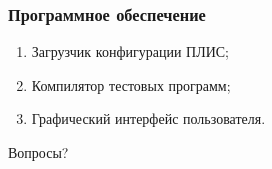 \documentclass{beamer}
\begin{document}

\begin{frame}
\frametitle{Программное обеспечение}
\begin{enumerate}
\item Загрузчик конфигурации ПЛИС;
\item Компилятор тестовых программ;
\item Графический интерфейс пользователя.
\end{enumerate}
\end{frame}


\begin{frame}
\Huge{\centerline{Вопросы?}}
\end{frame}

\end{document}
